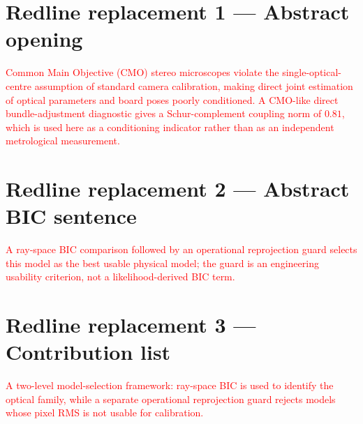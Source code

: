 %
%

\providecommand{\rev}[1]{\textcolor{red}{#1}}

\section*{Redline replacement 1 — Abstract opening}
\rev{Common Main Objective (CMO) stereo microscopes violate the single-optical-centre assumption of standard camera calibration, making direct joint estimation of optical parameters and board poses poorly conditioned.  A CMO-like direct bundle-adjustment diagnostic gives a Schur-complement coupling norm of $0.81$, which is used here as a conditioning indicator rather than as an independent metrological measurement.}

\section*{Redline replacement 2 — Abstract BIC sentence}
\rev{A ray-space BIC comparison followed by an operational reprojection guard selects this model as the best usable physical model; the guard is an engineering usability criterion, not a likelihood-derived BIC term.}

\section*{Redline replacement 3 — Contribution list}
\rev{A two-level model-selection framework: ray-space BIC is used to identify the optical family, while a separate operational reprojection guard rejects models whose pixel RMS is not usable for calibration.}

